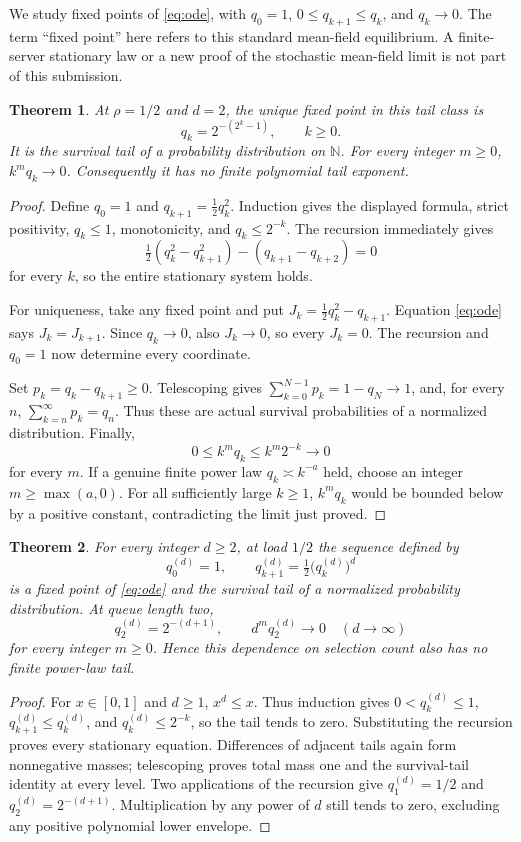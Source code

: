\documentclass[11pt]{article}
\newtheorem{theorem}{Theorem}
\begin{document}
We study fixed points of \eqref{eq:ode}, with $q_0=1$,
$0\le q_{k+1}\le q_k$, and $q_k\to0$. The term ``fixed point'' here
refers to this standard mean-field equilibrium. A finite-server
stationary law or a new proof of the stochastic mean-field limit
is not part of this submission.

\begin{theorem}\label{thm:two}
At $\rho=1/2$ and $d=2$, the unique fixed point in this tail class is
\[
 q_k=2^{-(2^k-1)},\qquad k\ge0.
\]
It is the survival tail of a probability distribution on
$\mathbb N$. For every integer $m\ge0$, $k^m q_k\to0$.
Consequently it has no finite polynomial tail exponent.
\end{theorem}
\begin{proof}
Define $q_0=1$ and $q_{k+1}=\tfrac12q_k^2$. Induction gives
the displayed formula, strict positivity, $q_k\le1$, monotonicity,
and $q_k\le2^{-k}$. The recursion immediately gives
\[
 \tfrac12(q_k^2-q_{k+1}^2)-(q_{k+1}-q_{k+2})=0
\]
for every $k$, so the entire stationary system holds.

For uniqueness, take any fixed point and put
$J_k=\tfrac12q_k^2-q_{k+1}$. Equation \eqref{eq:ode} says
$J_k=J_{k+1}$. Since $q_k\to0$, also $J_k\to0$, so every
$J_k=0$. The recursion and $q_0=1$ now determine every coordinate.

Set $p_k=q_k-q_{k+1}\ge0$. Telescoping gives
$\sum_{k=0}^{N-1}p_k=1-q_N\to1$, and, for every $n$,
$\sum_{k=n}^\infty p_k=q_n$. Thus these are actual survival
probabilities of a normalized distribution. Finally,
\[
 0\le k^m q_k\le k^m2^{-k}\longrightarrow0
\]
for every $m$. If a genuine finite power law $q_k\asymp k^{-a}$
held, choose an integer $m\ge\max(a,0)$. For all sufficiently large
$k\ge1$, $k^m q_k$ would be bounded below by a positive constant,
contradicting the limit just proved.
\end{proof}

\begin{theorem}\label{thm:d}
For every integer $d\ge2$, at load $1/2$ the sequence defined by
\[
 q^{(d)}_0=1,\qquad
 q^{(d)}_{k+1}=\tfrac12\bigl(q^{(d)}_k\bigr)^d
\]
is a fixed point of \eqref{eq:ode} and the survival tail of a
normalized probability distribution. At queue length two,
\[
 q^{(d)}_2=2^{-(d+1)},\qquad
 d^m q^{(d)}_2\longrightarrow0 \quad(d\to\infty)
\]
for every integer $m\ge0$. Hence this dependence on selection count
also has no finite power-law tail.
\end{theorem}
\begin{proof}
For $x\in[0,1]$ and $d\ge1$, $x^d\le x$. Thus induction gives
$0<q^{(d)}_k\le1$,
$q^{(d)}_{k+1}\le q^{(d)}_k$, and
$q^{(d)}_k\le2^{-k}$, so the tail tends to zero. Substituting the
recursion proves every stationary equation. Differences of adjacent
tails again form nonnegative masses; telescoping proves total mass
one and the survival-tail identity at every level. Two applications
of the recursion give $q^{(d)}_1=1/2$ and
$q^{(d)}_2=2^{-(d+1)}$. Multiplication by any power of $d$ still
tends to zero, excluding any positive polynomial lower envelope.
\end{proof}
\end{document}
